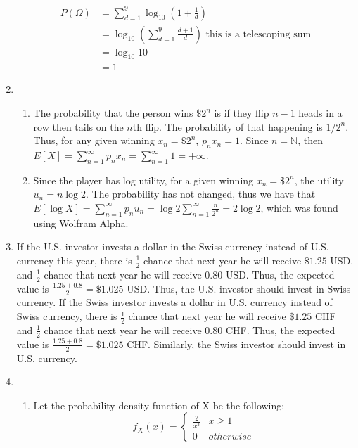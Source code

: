 \documentclass[letterpaper,12pt]{article}
\theoremstyle{definition}
\begin{document}
\begin{enumerate}
      \begin{align*}
        P(\Omega) &= \sum_{d = 1}^9 \log_{10} (1+\frac{1}{d}) \\
        &= \log_{10} (\sum_{d = 1}^9 \frac{d+1}{d}) \text{ this is a telescoping sum} \\
        &= \log_{10} 10 \\
        &= 1
      \end{align*}
  \item
    \begin{enumerate}
      \item
        The probability that the person wins $\$2^n$ is if they flip $n-1$ heads in a row then tails on the $n$th flip. The probability of that happening is $1/2^n$. Thus, for any given winning $x_n = \$2^n$, $p_nx_n = 1$. Since $n = \mathds{N}$, then $E[X] = \sum_{n = 1}^\infty p_nx_n = \sum_{n = 1}^\infty 1 = + \infty$.
      \item
        Since the player has log utility, for a given winning $x_n = \$2^n$, the utility $u_n = n\log{2}$. The probability has not changed, thus we have that $E[\log{X}] = \sum_{n = 1}^\infty p_nu_n = \log{2} \sum_{n = 1}^\infty \frac{n}{2^n} = 2\log{2}$, which was found using Wolfram Alpha.
    \end{enumerate}
  \item
    If the U.S. investor invests a dollar in the Swiss currency instead of U.S. currency this year, there is $\frac{1}{2}$ chance that next year he will receive $\$1.25$ USD. and $\frac{1}{2}$ chance that next year he will receive $0.80$ USD. Thus, the expected value is $\frac{1.25 + 0.8}{2} = \$1.025$ USD. Thus, the U.S. investor should invest in Swiss currency.
    If the Swiss investor invests a dollar in U.S. currency instead of Swiss currency, there is $\frac{1}{2}$ chance that next year he will receive $\$1.25$ CHF and $\frac{1}{2}$ chance that next year he will receive $0.80$ CHF. Thus, the expected value is $\frac{1.25 + 0.8}{2} = \$1.025$ CHF. Similarly, the Swiss investor should invest in U.S. currency.
  \item
    \begin{enumerate}
      \item
        Let the probability density function of X be the following:
          \[
            f_X(x) =
            \begin{cases}
              \frac{2}{x^3} & x \geq 1 \\
              0 & otherwise
            \end{cases}
\]
\end{enumerate}
\end{enumerate}
\end{document}
